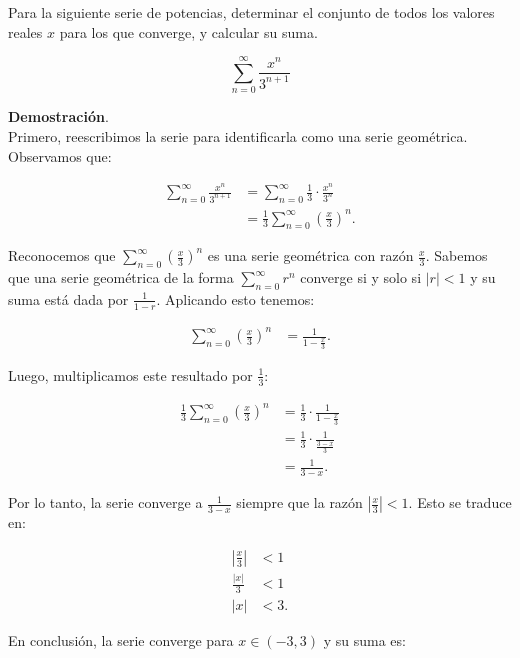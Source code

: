\documentclass{article}
\begin{document}
    Para la siguiente serie de potencias, determinar el conjunto de todos los valores reales $x$ para los que converge, y calcular su suma.

    $$
    \sum_{n=0}^{\infty} \frac{x^{n}}{3^{n+1}}
    $$

    \textbf{Demostración}.\\

    Primero, reescribimos la serie para identificarla como una serie geométrica. Observamos que:

    $$
    \begin{aligned}
    \sum_{n=0}^{\infty} \frac{x^{n}}{3^{n+1}} &= \sum_{n=0}^{\infty} \frac{1}{3} \cdot \frac{x^{n}}{3^{n}} \\
    &= \frac{1}{3} \sum_{n=0}^{\infty} \left(\frac{x}{3}\right)^{n}.
    \end{aligned}
    $$

    Reconocemos que $\sum_{n=0}^{\infty} \left(\frac{x}{3}\right)^{n}$ es una serie geométrica con razón $\frac{x}{3}$. Sabemos que una serie geométrica de la forma $\sum_{n=0}^{\infty} r^n$ converge si y solo si $|r| < 1$ y su suma está dada por $\frac{1}{1-r}$. Aplicando esto tenemos:

    $$
    \begin{aligned}
    \sum_{n=0}^{\infty} \left(\frac{x}{3}\right)^{n} &= \frac{1}{1-\frac{x}{3}}.
    \end{aligned}
    $$

    Luego, multiplicamos este resultado por $\frac{1}{3}$:

    $$
    \begin{aligned}
    \frac{1}{3} \sum_{n=0}^{\infty} \left(\frac{x}{3}\right)^{n} &= \frac{1}{3} \cdot \frac{1}{1-\frac{x}{3}} \\
    &= \frac{1}{3} \cdot \frac{1}{\frac{3-x}{3}} \\
    &= \frac{1}{3-x}.
    \end{aligned}
    $$

    Por lo tanto, la serie converge a $\frac{1}{3-x}$ siempre que la razón $\left|\frac{x}{3}\right| < 1$. Esto se traduce en:

    $$
    \begin{aligned}
    \left|\frac{x}{3}\right| &< 1 \\
    \frac{|x|}{3} &< 1 \\
    |x| &< 3.
    \end{aligned}
    $$

    En conclusión, la serie converge para $x \in (-3, 3)$ y su suma es:
\end{document}
